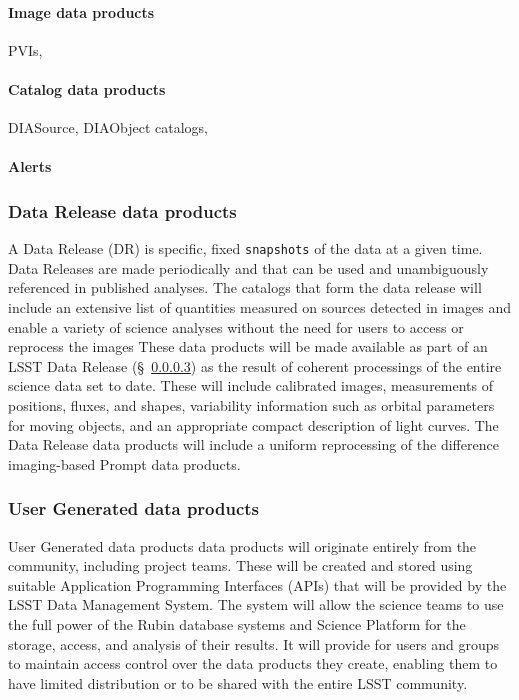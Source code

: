 \paragraph {Image data products}  PVIs,   
\paragraph {Catalog data products}  DIASource, DIAObject catalogs, 
\paragraph {Alerts}  


\subsubsection{Data Release data products} \label{sec:dp-release}
A Data Release (DR) is specific, fixed {\tt snapshots} of the data at a given time. 
Data Releases are made periodically and that can be used and 
unambiguously referenced in published analyses. 
The catalogs that form the data release will include an extensive list of quantities measured on sources detected in images and 
enable a variety of science analyses without the need for users to access or reprocess the images
These data products will be made available as part of an LSST Data Release (\S~\ref{}) as the result of coherent
processings of the entire science data set to date. 
These will include calibrated images, measurements of positions, fluxes, and shapes,  variability information such as orbital
parameters for moving objects, and an appropriate compact description of light curves.
The Data Release data products will include a uniform reprocessing of the difference imaging-based Prompt data products.


\subsubsection{User Generated data products} \label{sec:dp-user}
User Generated data products data products will originate entirely from the community, including project teams. 
These will be created and stored using suitable Application Programming Interfaces (APIs) 
that will be provided by the LSST Data Management System. 
The system will allow the science teams to use the full power of the Rubin database systems and
Science Platform for the storage, access, and analysis of their results. 
It will provide for users and groups to maintain access control over the data products they create, 
enabling them to have limited distribution or to be shared with the entire LSST community. 

